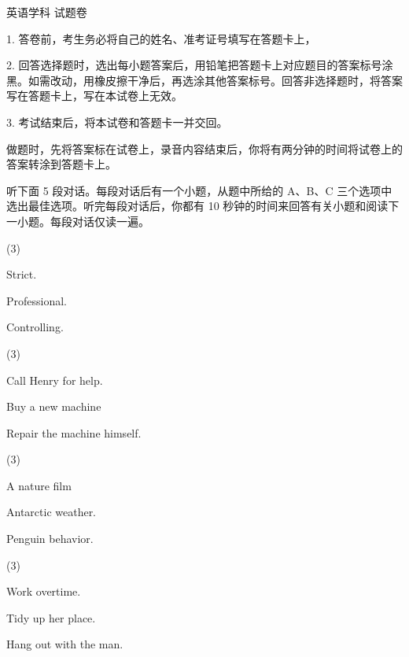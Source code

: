 \documentclass{英语试卷}
\begin{document}
\par 英语学科 试题卷\par
\begin{notice}
\par 1. 答卷前，考生务必将自己的姓名、准考证号填写在答题卡上，\par
\par 2. 回答选择题时，选出每小题答案后，用铅笔把答题卡上对应题目的答案标号涂黑。如需改动，用橡皮擦干净后，再选涂其他答案标号。回答非选择题时，将答案写在答题卡上，写在本试卷上无效。\par
\par 3. 考试结束后，将本试卷和答题卡一并交回。\par
\end{notice}
\par 做题时，先将答案标在试卷上，录音内容结束后，你将有两分钟的时间将试卷上的答案转涂到答题卡上。\par
{}
\par 听下面 5 段对话。每段对话后有一个小题，从题中所给的 A、B、C 三个选项中选出最佳选项。听完每段对话后，你都有 10 秒钟的时间来回答有关小题和阅读下一小题。每段对话仅读一遍。\par
{}
\begin{choices}(3)
  \item Strict.
  \item Professional.
  \item Controlling.
\end{choices}
\begin{choices}(3)
  \item Call Henry for help.
  \item Buy a new machine
  \item Repair the machine himself.
\end{choices}
\begin{choices}(3)
  \item A nature film
  \item Antarctic weather.
  \item Penguin behavior.
\end{choices}
\begin{choices}(3)
  \item Work overtime.
  \item Tidy up her place.
  \item Hang out with the man.
\end{choices}
\end{document}
